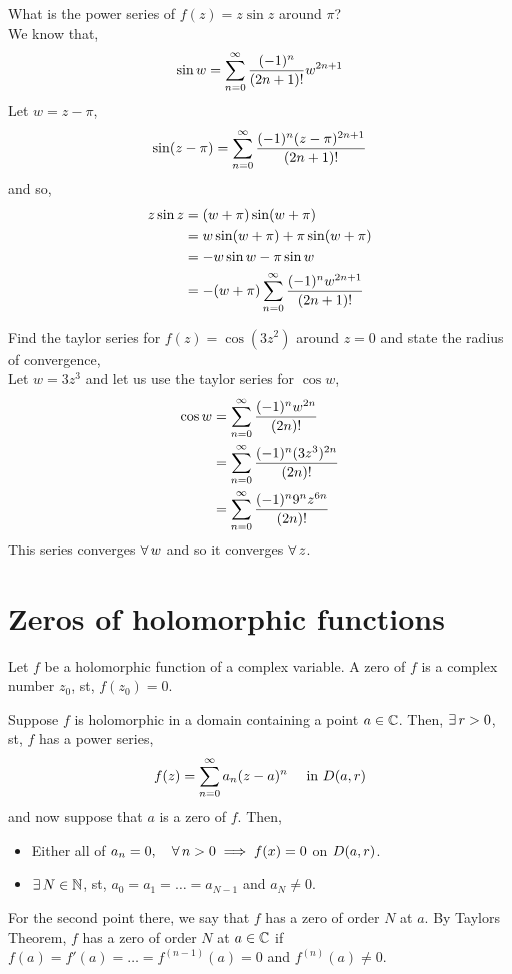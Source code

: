 \documentclass{article}
\begin{document}
\begin{eg}
  What is the power series of $\displaystyle{f(z) = z\sin z}$ around $\pi$?\\
  We know that,
  $$ \sin w = \sum_{n=0}^\infty \frac{(-1)^n}{(2n + 1)!}w^{2n+1} $$
  Let $w = z - \pi$,
  $$ \sin(z - \pi) = \sum_{n=0}^\infty \frac{(-1)^n(z - \pi)^{2n + 1}}{(2n + 1)!} $$
  and so,
  \begin{align*}
    z\sin z &= (w + \pi)\sin(w + \pi)\\
    &= w\sin(w + \pi) + \pi\sin(w + \pi)\\
    &= -w\sin w - \pi \sin w\\
    &= -(w + \pi)\sum_{n=0}^\infty \frac{(-1)^nw^{2n+1}}{(2n + 1)!}
  \end{align*}
\end{eg}

\begin{eg}
  Find the taylor series for $f(z) = \cos (3z^2)$ around $z= 0$ and state the radius of convergence,\\
  Let $w = 3z^3$ and let us use the taylor series for $\cos w$,
  \begin{align*}
    \cos w &= \sum_{n=0}^\infty \frac{(-1)^nw^{2n}}{(2n)!}\\
    &= \sum_{n=0}^\infty \frac{(-1)^n(3z^3)^{2n}}{(2n)!}\\
    &= \sum_{n=0}^\infty \frac{(-1)^n9^nz^{6n}}{(2n)!}
  \end{align*}
  This series converges $\forall\, w$ and so it converges $\forall\, z$.
\end{eg}

\section{Zeros of holomorphic functions}
Let $f$ be a holomorphic function of a complex variable. A zero of $f$ is a complex number $z_0$, st, $f(z_0) = 0$.

Suppose $f$ is holomorphic in a domain containing a point $a\in\mathbb{C}$. Then, $\exists\, r > 0$, st, $f$ has a power series,
$$ f(z)= \sum_{n=0}^\infty a_n(z - a)^n \quad \text{ in }D(a, r) $$
and now suppose that $a$ is a zero of $f$. Then,
\begin{itemize}
  \item Either all of $a_n = 0, \quad \forall\, n > 0 \implies f(x) = 0$ on $D(a, r)$.
  \item $\exists\, N\in\mathbb{N}$, st, $a_0=a_1=\dots=a_{N-1}$ and $a_N \ne 0$.
\end{itemize}

For the second point there, we say that $f$ has a zero of order $N$ at $a$. By Taylors Theorem, $f$ has a zero of order $N$ at $a\in\mathbb{C}$ if $f(a) = f'(a) = \dots = f^{(n-1)}(a) = 0$ and $f^{(n)}(a) \ne 0$.
\end{document}
